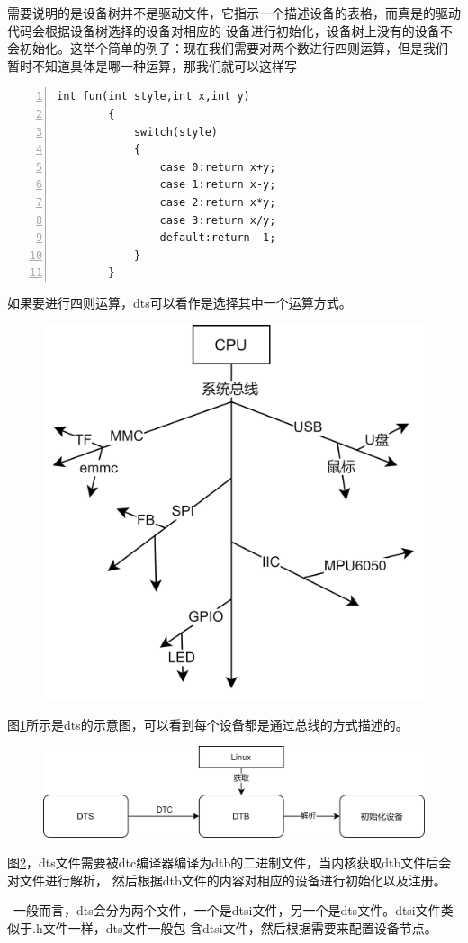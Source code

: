 需要说明的是设备树并不是驱动文件，它指示一个描述设备的表格，而真是的驱动代码会根据设备树选择的设备对相应的
设备进行初始化，设备树上没有的设备不会初始化。这举个简单的例子：现在我们需要对两个数进行四则运算，但是我们
暂时不知道具体是哪一种运算，那我们就可以这样写
\begin{lstlisting}[language={[ANSI]C},numbers=left,numberstyle=\tiny,frame=shadowbox,
		rulesepcolor=\color{red!20!green!20!blue!20},
		keywordstyle=\color{blue!70!black},
		commentstyle=\color{blue!90!},
		basicstyle=\ttfamily]
		int fun(int style,int x,int y)
		{
			switch(style)
			{
				case 0:return x+y;
				case 1:return x-y;
				case 2:return x*y;
				case 3:return x/y;
				default:return -1;
			}
		}
\end{lstlisting}
如果要进行四则运算，dts可以看作是选择其中一个运算方式。
\begin{figure}[h]
	\centering
	\includegraphics[width=1\linewidth]{chapter3/img/DTS}
	\caption{}
	\label{fig:dts}
\end{figure}
图\ref{fig:dts}所示是dts的示意图，可以看到每个设备都是通过总线的方式描述的。
\begin{figure}[htbp]
	\centering
	\includegraphics[width=0.6\linewidth]{chapter3/img/DTSstream}
	\caption{}
	\label{fig:dtsstream}
\end{figure}
图\ref{fig:dtsstream}，dts文件需要被dtc编译器编译为dtb的二进制文件，当内核获取dtb文件后会对文件进行解析，
然后根据dtb文件的内容对相应的设备进行初始化以及注册。
\begin{tcolorbox}[colback=red!5!white,colframe=red!75!black]
	\faWarning\  
	一般而言，dts会分为两个文件，一个是dtsi文件，另一个是dts文件。dtsi文件类似于.h文件一样，dts文件一般包
	含dtsi文件，然后根据需要来配置设备节点。
\end{tcolorbox}

